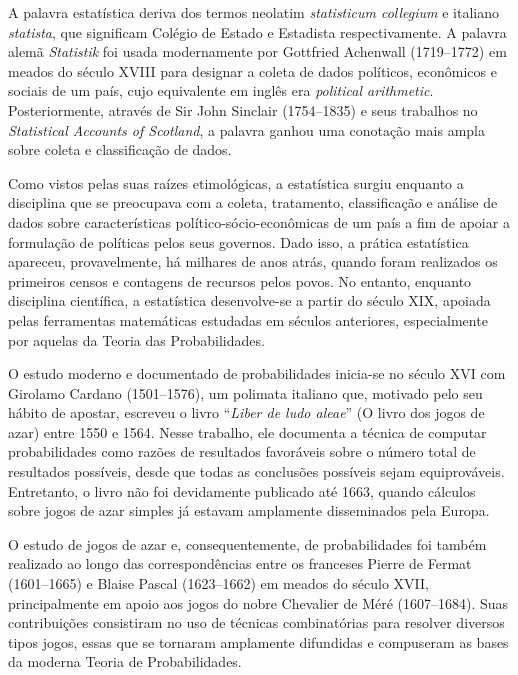 A palavra estatística deriva dos termos neolatim \textit{statisticum collegium} e italiano
\textit{statista}, que significam Colégio de Estado e Estadista respectivamente.
A palavra alemã \textit{Statistik} foi usada modernamente por Gottfried Achenwall
(1719--1772) em meados do século XVIII para designar a coleta de dados políticos,
econômicos e sociais de um país, cujo equivalente em inglês era \textit{political
arithmetic}.
Posteriormente, através de Sir John Sinclair (1754--1835) e seus trabalhos no
\textit{Statistical Accounts of Scotland}, a palavra ganhou uma conotação mais ampla sobre
coleta e classificação de dados.

Como vistos pelas suas raízes etimológicas, a estatística surgiu enquanto a disciplina
que se preocupava com a coleta, tratamento, classificação e análise de dados sobre
características político-sócio-econômicas de um país a fim de apoiar a formulação de
políticas pelos seus governos.
Dado isso, a prática estatística apareceu, provavelmente, há milhares de anos atrás,
quando foram realizados os primeiros censos e contagens de recursos pelos povos.
No entanto, enquanto disciplina científica, a estatística desenvolve-se a partir
do século XIX, apoiada pelas ferramentas matemáticas estudadas em séculos anteriores,
especialmente por aquelas da Teoria das Probabilidades.

O estudo moderno e documentado de probabilidades inicia-se no século XVI com Girolamo
Cardano (1501--1576), um polimata italiano que, motivado pelo seu hábito de apostar, escreveu o livro
``\textit{Liber de ludo aleae}'' (O livro dos jogos de azar) entre 1550 e 1564.
Nesse trabalho, ele documenta a técnica de computar probabilidades como razões
de resultados favoráveis sobre o número total de resultados possíveis, desde que todas
as conclusões possíveis sejam equiprováveis.
Entretanto, o livro não foi devidamente publicado até 1663, quando cálculos sobre jogos
de azar simples já estavam amplamente disseminados pela Europa.

O estudo de jogos de azar e, consequentemente, de probabilidades foi também realizado ao
longo das correspondências entre os franceses Pierre de Fermat (1601--1665) e Blaise
Pascal (1623--1662) em meados do século XVII, principalmente em apoio aos jogos do
nobre Chevalier de Méré (1607--1684).
Suas contribuições consistiram no uso de técnicas combinatórias para resolver diversos
tipos jogos, essas que se tornaram amplamente difundidas e compuseram as bases da moderna
Teoria de Probabilidades.


